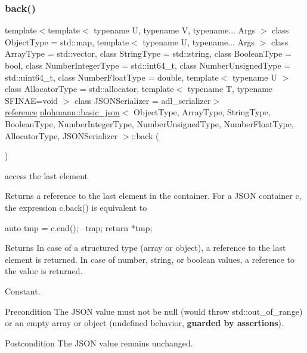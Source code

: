 \subsubsection{\texorpdfstring{back()}{back()}\hspace{0.1cm}{\footnotesize\ttfamily [1/2]}}
{\footnotesize\ttfamily template$<$template$<$ typename U, typename V, typename... Args $>$ class Object\+Type = std\+::map, template$<$ typename U, typename... Args $>$ class Array\+Type = std\+::vector, class String\+Type  = std\+::string, class Boolean\+Type  = bool, class Number\+Integer\+Type  = std\+::int64\+\_\+t, class Number\+Unsigned\+Type  = std\+::uint64\+\_\+t, class Number\+Float\+Type  = double, template$<$ typename U $>$ class Allocator\+Type = std\+::allocator, template$<$ typename T, typename S\+F\+I\+N\+A\+E=void $>$ class J\+S\+O\+N\+Serializer = adl\+\_\+serializer$>$ \\
\mbox{\hyperlink{classnlohmann_1_1basic__json_ac6a5eddd156c776ac75ff54cfe54a5bc}{reference}} \mbox{\hyperlink{classnlohmann_1_1basic__json}{nlohmann\+::basic\+\_\+json}}$<$ Object\+Type, Array\+Type, String\+Type, Boolean\+Type, Number\+Integer\+Type, Number\+Unsigned\+Type, Number\+Float\+Type, Allocator\+Type, J\+S\+O\+N\+Serializer $>$\+::back (\begin{DoxyParamCaption}{ }\end{DoxyParamCaption})\hspace{0.3cm}{\ttfamily [inline]}}



access the last element 

Returns a reference to the last element in the container. For a J\+S\+ON container {\ttfamily c}, the expression {\ttfamily c.\+back()} is equivalent to 
\begin{DoxyCode}
\textcolor{keyword}{auto} tmp = c.end();
--tmp;
\textcolor{keywordflow}{return} *tmp;
\end{DoxyCode}


\begin{DoxyReturn}{Returns}
In case of a structured type (array or object), a reference to the last element is returned. In case of number, string, or boolean values, a reference to the value is returned.
\end{DoxyReturn}
Constant.

\begin{DoxyPrecond}{Precondition}
The J\+S\+ON value must not be {\ttfamily null} (would throw {\ttfamily std\+::out\+\_\+of\+\_\+range}) or an empty array or object (undefined behavior, {\bfseries guarded by assertions}). 
\end{DoxyPrecond}
\begin{DoxyPostcond}{Postcondition}
The J\+S\+ON value remains unchanged.
\end{DoxyPostcond}

